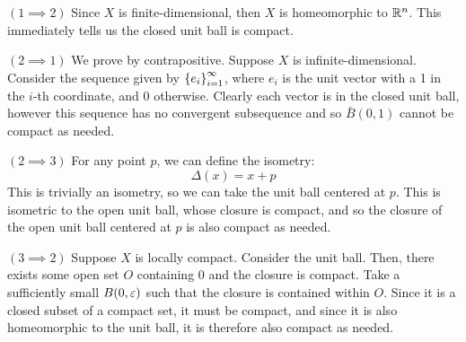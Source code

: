 \begin{soln}
    $ (1 \implies 2) $
    Since $ X $ is finite-dimensional, then $ X $ is homeomorphic to
    $ \mathbb{R}^{n} $. This immediately tells us the closed unit ball is compact.
    \npgh

    $ (2 \implies 1) $
    We prove by contrapositive. Suppose $ X $ is infinite-dimensional. Consider
    the sequence given by $ \left\{{e_{i}}\right\}_{i=1}^{\infty} $, where $ e_{i} $ is the
    unit vector with a 1 in the $ i $-th coordinate, and $ 0 $ otherwise.
    Clearly each vector is in the closed unit ball, however this sequence has no
    convergent subsequence and so $ \bar{B}(0, 1) $ cannot be compact as needed.
    \npgh

    $ (2 \implies 3) $
    For any point $ p $, we can define the isometry:
    \begin{equation*}
        \Delta(x) = x + p
    \end{equation*}
    This is trivially an isometry, so we can take the unit ball centered at
    $ p $. This is isometric to the open unit ball, whose closure is compact, and
    so the closure of the open unit ball centered at $ p $ is also compact as
    needed. \npgh

    $ (3 \implies 2) $
    Suppose $ X $ is locally compact. Consider the unit ball. Then, there exists
    some open set $ O $ containing $ 0 $ and the closure is compact. Take a
    sufficiently small $ B(0, \operatorname{\varepsilon})  $ such that the closure is contained within
    $ O $. Since it is a closed subset of a compact set, it must be compact, and
    since it is also homeomorphic to the unit ball, it is therefore also compact
    as needed.
\end{soln}


